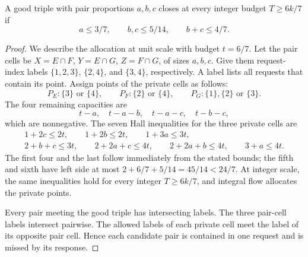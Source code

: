 \begin{lemma}\label{lem:hallstatic}
A good triple with pair proportions $a,b,c$ closes at every integer
budget $T\ge6k/7$ if
\[
 a\le3/7,\qquad b,c\le5/14,\qquad b+c\le4/7.
\]
\end{lemma}
\begin{proof}
We describe the allocation at unit scale with budget $t=6/7$.
Let the pair cells be $X=E\cap F$, $Y=E\cap G$, $Z=F\cap G$,
of sizes $a,b,c$. Give them request-index labels
$\{1,2,3\}$, $\{2,4\}$, and $\{3,4\}$, respectively.
A label lists all requests that contain its point. Assign points of the
private cells as follows:
\[
 P_E:\{3\}\text{ or }\{4\},\qquad
 P_F:\{2\}\text{ or }\{4\},\qquad
 P_G:\{1\},\{2\}\text{ or }\{3\}.
\]
The four remaining capacities are
\[
 t-a,\quad t-a-b,\quad t-a-c,\quad t-b-c,
\]
which are nonnegative. The seven Hall inequalities for the three
private cells are
\begin{gather*}
 1+2c\le2t,\qquad 1+2b\le2t,\qquad 1+3a\le3t,\\
 2+b+c\le3t,\qquad 2+2a+c\le4t,\qquad
 2+2a+b\le4t,\qquad 3+a\le4t.
\end{gather*}
The first four and the last follow immediately from the stated bounds;
the fifth and sixth have left side at most
$2+6/7+5/14=45/14<24/7$.
At integer scale, the same inequalities hold for every integer
$T\ge6k/7$, and integral flow allocates the private points.

Every pair meeting the good triple has intersecting labels. The three
pair-cell labels intersect pairwise. The allowed labels of each private
cell meet the label of its opposite pair cell. Hence each candidate
pair is contained in one request and is missed by its response.
\end{proof}

